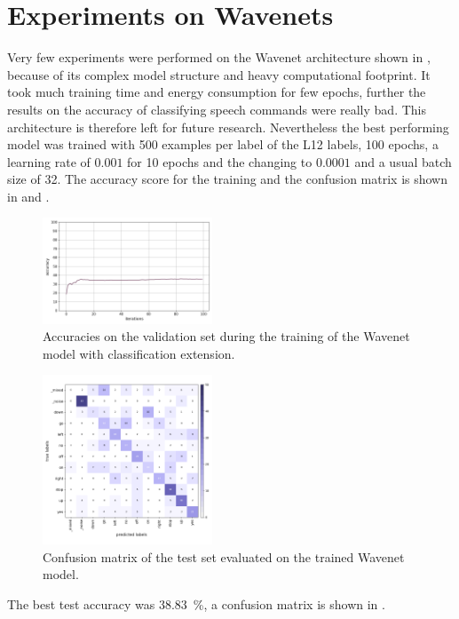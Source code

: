 
\section{Experiments on Wavenets}\label{exp_wavenet}
\thesisStateReady
Very few experiments were performed on the Wavenet architecture shown in , because of its complex model structure and heavy computational footprint.
It took much training time and energy consumption for few epochs, further the results on the accuracy of classifying speech commands were really bad.
This architecture is therefore left for future research.
Nevertheless the best performing model was trained with 500 examples per label of the L12 labels, 100 epochs, a learning rate of $0.001$ for 10 epochs and the changing to $0.0001$ and a usual batch size of 32.
The accuracy score for the training and the confusion matrix is shown in  and .
\begin{figure}[!ht]
  \centering
  \includegraphics[width=0.45\textwidth]{./5_exp/figs/exp_wavenet_acc}
  \caption{Accuracies on the validation set during the training of the Wavenet model with classification extension.}
  \label{fig:exp_wavenet_acc}
\end{figure}
\FloatBarrier
\noindent
\begin{figure}[!ht]
  \centering
  \includegraphics[width=0.45\textwidth]{./5_exp/figs/exp_wavenet_confusion_test}
  \caption{Confusion matrix of the test set evaluated on the trained Wavenet model.}
  \label{fig:exp_wavenet_confusion}
\end{figure}
\FloatBarrier
\noindent
The best test accuracy was \SI{38.83}{\percent}, a confusion matrix is shown in .

